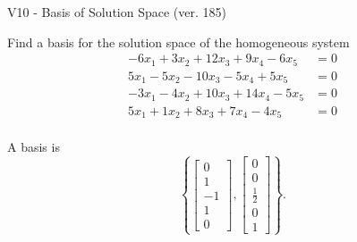 \begin{exercise}
  \begin{exerciseTitle}V10 - Basis of Solution Space (ver. 185)\end{exerciseTitle}
  \begin{exerciseStatement}
    Find a basis for the solution space of the homogeneous system 
\begin{align*}
 -6 x_ 1 + 3 x_ 2 + 12 x_ 3 + 9 x_ 4 -6 x_ 5 &= 0  \\ 
  5 x_ 1 -5 x_ 2 -10 x_ 3 -5 x_ 4 + 5 x_ 5 &= 0  \\ 
  -3 x_ 1 -4 x_ 2 + 10 x_ 3 + 14 x_ 4 -5 x_ 5 &= 0  \\ 
  5 x_ 1 + 1 x_ 2 + 8 x_ 3 + 7 x_ 4 -4 x_ 5 &= 0  \\ 
 \end{align*}


 
  \end{exerciseStatement}

  \begin{exerciseAnswer}
   A basis is   
\[\left\{\left[\begin{array}{c}
0 \\
1 \\
-1 \\
1 \\
0
\end{array}\right] , \left[\begin{array}{c}
0 \\
0 \\
\frac{1}{2} \\
0 \\
1
\end{array}\right]\right\}.\]

  


  \end{exerciseAnswer}
\end{exercise}